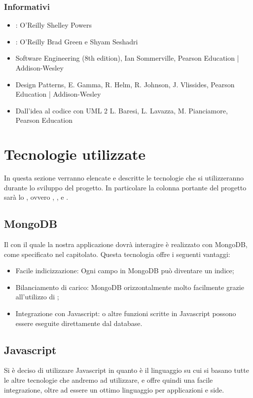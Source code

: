 \subsubsection{Informativi}
\begin{itemize}
\item {}: O'Reilly Shelley Powers
\item {}: O'Reilly Brad Green e Shyam Seshadri
\item Software Engineering (8th edition), Ian Sommerville, Pearson Education | Addison-Wesley
\item Design Patterns, E. Gamma, R. Helm, R. Johnson, J. Vlissides, Pearson Education | Addison-Wesley
\item Dall'idea al codice con UML 2       L. Baresi, L. Lavazza, M. Pianciamore, Pearson Education
\end{itemize}

\newpage
\section{Tecnologie utilizzate}
In questa sezione verranno elencate e descritte le tecnologie che si utilizzeranno durante lo sviluppo del progetto. In particolare la colonna portante del progetto sarà lo  , ovvero , ,  e .

\subsection{MongoDB}
Il  con il quale la nostra applicazione dovrà interagire è realizzato con MongoDB, come specificato nel capitolato. Questa tecnologia offre i seguenti vantaggi:
\begin{itemize}
\item Facile indicizzazione: Ogni campo in MongoDB può diventare un indice;
\item Bilanciamento di carico: MongoDB  orizzontalmente molto facilmente grazie all'utilizzo di ;
\item Integrazione con Javascript:  o altre funzioni scritte in Javascript possono essere eseguite direttamente dal database.
\end{itemize}

\subsection{Javascript}
Si è deciso di utilizzare Javascript in quanto è il linguaggio su cui si basano tutte le altre tecnologie che andremo ad utilizzare, e offre quindi una facile integrazione, oltre ad essere un ottimo linguaggio per applicazioni  e  side.

